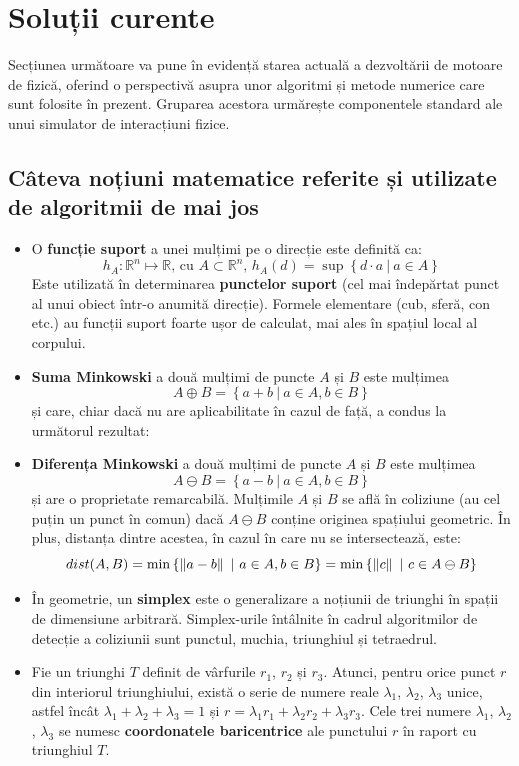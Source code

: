 \documentclass[12pt,a4paper]{report}
\begin{document}
\section{Soluții curente}
Secțiunea următoare va pune în evidență starea actuală a dezvoltării de motoare de fizică, oferind o perspectivă asupra unor algoritmi și metode numerice care sunt folosite în prezent. Gruparea acestora urmărește componentele standard ale unui simulator de interacțiuni fizice.
\subsection{Câteva noțiuni matematice referite și utilizate de algoritmii de mai jos}
\begin{itemize}
	\item O \textbf{funcție suport} a unei mulțimi pe o direcție este definită ca:
	$$ h_A:\mathbb{R}^{n} \mapsto \mathbb{R} \textrm{, cu }A \subset \mathbb{R}^{n}\textrm{,  } h_A(d) = \sup \left\lbrace d\cdot a\ |\ a\in A\right\rbrace $$
	Este utilizată în determinarea \textbf{punctelor suport} (cel mai îndepărtat punct al unui obiect într-o anumită direcție). Formele elementare (cub, sferă, con etc.) au funcții suport foarte ușor de calculat, mai ales în spațiul local al corpului.
	\label{support_points}
	\item \textbf{Suma Minkowski} a două mulțimi de puncte $A$ și $B$ este mulțimea
	$$ A \oplus B = \left\lbrace a + b\ |\ a \in A, b \in B \right\rbrace $$
	și care, chiar dacă nu are aplicabilitate în cazul de față, a condus la următorul rezultat:
	\item \textbf{Diferența Minkowski} a două mulțimi de puncte $A$ și $B$ este mulțimea
	$$ A \ominus B = \left\lbrace a - b\ |\ a \in A, b \in B \right\rbrace $$
	și are o proprietate remarcabilă. Mulțimile $A$ și $B$ se află în coliziune (au cel puțin un punct în comun) dacă $A \ominus B$ conține originea spațiului geometric. În plus, distanța dintre acestea, în cazul în care nu se intersectează, este:
	$$ \centering dist(A, B) = \min \left\lbrace \left\Vert a - b \right\Vert\ |\ a \in A, b \in B \right\rbrace = \min \left\lbrace \left\Vert c \right\Vert\ |\ c \in A \ominus B \right\rbrace $$
	\label{minkowski_difference}
	\item În geometrie, un \textbf{simplex} este o generalizare a noțiunii de triunghi în spații de dimensiune arbitrară. Simplex-urile întâlnite în cadrul algoritmilor de detecție a coliziunii sunt punctul, muchia, triunghiul și tetraedrul.
	\label{simplex}
	\item Fie un triunghi $T$ definit de vârfurile $r_1$, $r_2$ și $r_3$. Atunci, pentru orice punct $r$ din interiorul triunghiului, există o serie de numere reale $\lambda_1$, $\lambda_2$, $\lambda_3$ unice, astfel încât $\lambda_1 + \lambda_2 + \lambda_3 = 1$ și $r = \lambda_1 r_1 + \lambda_2 r_2 + \lambda_3 r_3$. Cele trei numere $\lambda_1$, $\lambda_2$, $\lambda_3$ se numesc \textbf{coordonatele baricentrice} ale punctului $r$ în raport cu triunghiul $T$.

\end{itemize}
\end{document}
